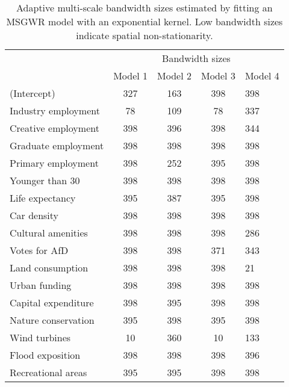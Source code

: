 \begin{table}

\caption[Adaptive multi-scale bandwidth sizes]{\label{tab:msbw}Adaptive multi-scale bandwidth sizes estimated by fitting an MSGWR model with an exponential kernel. Low bandwidth sizes indicate spatial non-stationarity.}
\centering
\begin{tabular}[t]{lcccl}
\toprule
\multicolumn{1}{c}{ } & \multicolumn{4}{c}{Bandwidth sizes} \\
\cmidrule(l{3pt}r{3pt}){2-5}
 & Model 1 & Model 2 & Model 3 & Model 4\\
\midrule
(Intercept) & 327 & 163 & 398 & 398\\
Industry employment & 78 & 109 & 78 & 337\\
Creative employment & 398 & 396 & 398 & 344\\
Graduate employment & 398 & 398 & 398 & 398\\
Primary employment & 398 & 252 & 395 & 398\\
\addlinespace
Younger than 30 & 398 & 398 & 398 & 398\\
Life expectancy & 395 & 387 & 395 & 398\\
Car density & 398 & 398 & 398 & 398\\
Cultural amenities & 398 & 398 & 398 & 286\\
Votes for AfD & 398 & 398 & 371 & 343\\
\addlinespace
Land consumption & 398 & 398 & 398 & 21\\
Urban funding & 398 & 398 & 398 & 398\\
Capital expenditure & 398 & 395 & 398 & 398\\
Nature conservation & 395 & 398 & 395 & 398\\
Wind turbines & 10 & 360 & 10 & 133\\
\addlinespace
Flood exposition & 398 & 398 & 398 & 396\\
Recreational areas & 395 & 395 & 398 & 398\\
\bottomrule
\end{tabular}
\end{table}
